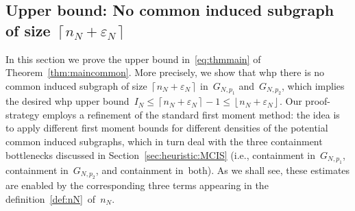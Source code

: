 \documentclass{article}
\newcommand{\eps}{\varepsilon}
\newcommand\floor[1]{\left\lfloor #1 \right \rfloor}
\newcommand\ceil[1]{\left\lceil #1 \right \rceil}
\newcommand{\nN}{n_N}
\begin{document}
\subsection{Upper bound: No common induced subgraph of size $\ceil{\nN+\eps_N}$} \label{sec:commonfirst}
In this section we prove the upper bound in~\eqref{eq:thmmain} of Theorem~\ref{thm:maincommon}.
More precisely, we show that whp there is no common induced subgraph of size $\ceil{\nN+\eps_N}$ in~$G_{N,p_1}$ and~$G_{N,p_2}$, 
which implies the desired whp upper bound~$I_N \le \ceil{\nN+\eps_N}-1 \le  \floor{\nN+\eps_N}$. 
Our proof-strategy employs a refinement of the standard first moment method: the idea is to apply different first moment bounds
for different densities of the potential common induced subgraphs, 
which in turn deal with the three containment bottlenecks discussed in Section~\ref{sec:heuristic:MCIS} (i.e., containment in~$G_{N,p_1}$, containment in~$G_{N,p_2}$, and containment in~both). 
As we shall see, these estimates are enabled by the corresponding three terms appearing in the definition~\eqref{def:nN}~of~$n_N$.
\end{document}

